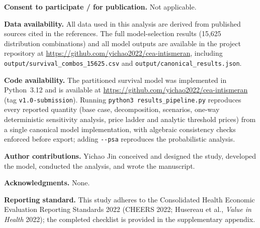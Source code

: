 \documentclass[11pt,a4paper]{article}
\begin{document}
\textbf{Consent to participate / for publication.} Not applicable.

\textbf{Data availability.} All data used in this analysis are derived from published sources cited in the references.
The full model-selection results (15{,}625 distribution combinations) and all model outputs are available in the
project repository at \url{https://github.com/yichao2022/cea-intismeran}, including
\texttt{output/survival\_combos\_15625.csv} and \texttt{output/canonical\_results.json}.

\textbf{Code availability.} The partitioned survival model was implemented in Python~3.12 and is available at
\url{https://github.com/yichao2022/cea-intismeran} (tag \texttt{v1.0-submission}).
Running \texttt{python3 results\_pipeline.py} reproduces every reported quantity (base case, decomposition,
scenarios, one-way deterministic sensitivity analysis, price ladder and analytic threshold prices) from a single
canonical model implementation, with algebraic consistency checks enforced before export;
adding \texttt{-\/-psa} reproduces the probabilistic analysis.

\textbf{Author contributions.} Yichao Jin conceived and designed the study, developed the model, conducted the
analysis, and wrote the manuscript.

\textbf{Acknowledgments.} None.

\textbf{Reporting standard.} This study adheres to the Consolidated Health Economic Evaluation Reporting Standards
2022 (CHEERS 2022; Husereau et al., \textit{Value in Health} 2022); the completed checklist is provided in the
supplementary appendix.
\end{document}
